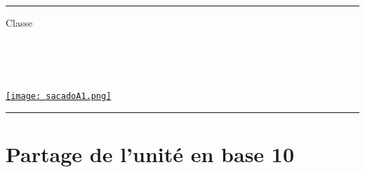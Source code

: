 \documentclass[a4paper,dvipsnames]{article}
\begin{document}

\fancyhead[C]{}
\hrule\medskip %
\begin{minipage}{0.295\textwidth} 
\raggedright
Classe \myClasse \hfill\\
\myDiscipline \hfill\\
\myParcours \hfill\\
\end{minipage}
\begin{minipage}{0.4\textwidth} 
\centering 
\scshape\huge
\textcolor{sacado_purple}{\myTitle} \\ 
\normalsize 
\end{minipage}
\begin{minipage}{0.295\textwidth} 
\raggedleft
\href{https://sacado.xyz/}{\texttt{[image: sacadoA1.png]}}
\end{minipage}
\medskip \hrule
\bigskip


\section{Partage de l'unité en base 10}
\end{document}
